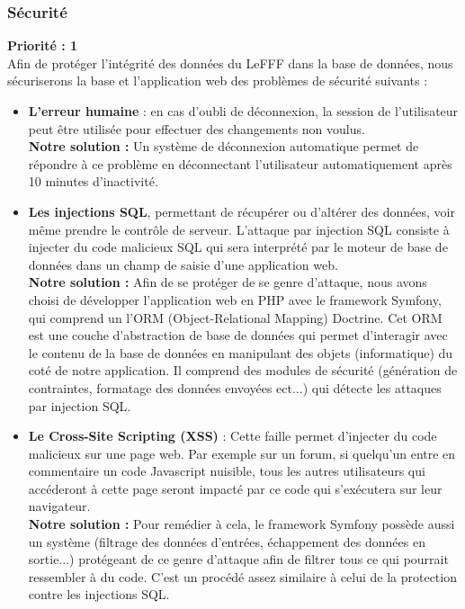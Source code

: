\documentclass[12pt,a4paper]{article}
\begin{document}
    \subsubsection{Sécurité}
    \textbf{Priorité : 1} \\
    Afin de protéger l'intégrité des données du LeFFF dans la base de données, nous sécuriserons la base et l'application web des problèmes de sécurité suivants :
    \begin{itemize}
        \item \textbf{L'erreur humaine} : en cas d'oubli de déconnexion, la session de l'utilisateur peut être utilisée pour effectuer des changements non voulus. \\
        \textbf{Notre solution :} Un système de déconnexion automatique permet de répondre à ce problème en déconnectant l'utilisateur automatiquement après 10 minutes d'inactivité.

        \item \textbf{Les injections SQL}, permettant de récupérer ou d'altérer des données, voir même prendre le contrôle de serveur. L'attaque par injection SQL consiste à injecter du code malicieux SQL qui sera interprété par le moteur de base de données dans un champ de saisie d'une application web. \\
        \textbf{Notre solution :} Afin de se protéger de se genre d'attaque, nous avons choisi de développer l'application web en PHP avec le framework Symfony, qui comprend un l'ORM (Object-Relational Mapping) Doctrine. Cet ORM est une couche d'abstraction de base de données qui permet d'interagir avec le contenu de la base de données en manipulant des objets (informatique) du coté de notre application. Il comprend des modules de sécurité (génération de contraintes, formatage des données envoyées ect...) qui détecte les attaques par injection SQL.

        \item \textbf{Le Cross-Site Scripting (XSS)} : Cette faille permet d'injecter du code malicieux sur une page web. Par exemple sur un forum, si quelqu'un entre en commentaire un code Javascript nuisible, tous les autres utilisateurs qui accéderont à cette page seront impacté par ce code qui s'exécutera sur leur navigateur. \\
        \textbf{Notre solution :} Pour remédier à cela, le framework Symfony possède aussi un système (filtrage des données d'entrées, échappement des données en sortie...) protégeant de ce genre d'attaque afin de filtrer tous ce qui pourrait ressembler à du code. C'est un procédé assez similaire à celui de la protection contre les injections SQL.


\end{itemize}
\end{document}
